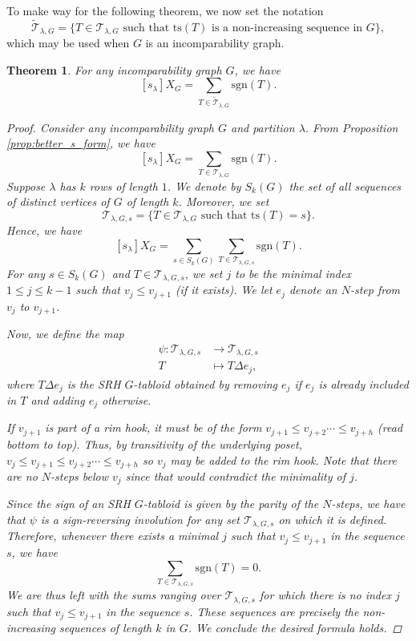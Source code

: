 \documentclass[12pt]{amsart}
\numberwithin{equation}{section}
\theoremstyle{plain}
\newtheorem{theorem}[equation]{Theorem}
\theoremstyle{definition}
\theoremstyle{remark}
\begin{document}
To make way for the following theorem, we now set the notation
\[
\tilde{\mathcal{T}}_{\lambda,G}=\{ T\in \mathcal{T}_{\lambda,G} \text{ such that } \text{ts}(T)\text{ is a non-increasing sequence in $G$}\},
\]
which may be used when $G$ is an incomparability graph.
\begin{theorem}
\label{thm:inv_paths_tail}
For any incomparability graph $G$, we have
\[
[s_{\lambda}]X_G=\sum_{T\in\tilde{\mathcal{T}}_{\lambda,G}}\mathrm{sgn}(T).
\]
\begin{proof}
Consider any incomparability graph $G$ and partition $\lambda$. From Proposition \ref{prop:better_s_form}, we have
\[
[s_{\lambda}]X_G=\sum_{T\in\mathcal{T}_{\lambda,G}}\mathrm{sgn}(T).
\]
Suppose $\lambda$ has $k$ rows of length $1$. We denote by $S_k(G)$ the set of all sequences of distinct vertices of $G$ of length $k$. Moreover, we set
\[
\mathcal{T}_{\lambda,G,s}=\{T\in\mathcal{T}_{\lambda,G}\text{ such that }\text{ts}(T)=s\}.
\]
Hence, we have
\[
[s_{\lambda}]X_G=\sum_{s\in S_k(G)}\sum_{T\in\mathcal{T}_{\lambda,G,s}}\mathrm{sgn}(T).
\]
For any $s\in S_k(G)$ and $T\in \mathcal{T}_{\lambda,G,s}$, we set $j$ to be the minimal index $1\le j \le k-1$ such that $v_j\le v_{j+1}$ (if it exists). We let $e_j$ denote an $N$-step from $v_j$ to $v_{j+1}$.

Now, we define the map
\begin{align*}
\psi: \mathcal{T}_{\lambda,G,s} &\to \mathcal{T}_{\lambda,G,s}\\
T &\mapsto T\Delta e_j,
\end{align*}
where $T\Delta e_j$ is the SRH $G$-tabloid obtained by removing $e_j$ if $e_j$ is already included in $T$ and adding $e_j$ otherwise.


If $v_{j+1}$ is part of a rim hook, it must be of the form $v_{j+1}\le v_{j+2}\cdots\le v_{j+h}$ (read bottom to top). Thus, by transitivity of the underlying poset, $v_{j}\le v_{j+1}\le v_{j+2}\cdots\le v_{j+h}$ so $v_j$ may be added to the rim hook. Note that there are no $N$-steps below $v_j$ since that would contradict the minimality of $j$. 


Since the sign of an SRH $G$-tabloid is given by the parity of the $N$-steps, we have that $\psi$ is a sign-reversing involution for any set $\mathcal{T}_{\lambda,G,s}$ on which it is defined. Therefore, whenever there exists a minimal $j$ such that $v_j\le v_{j+1}$ in the sequence $s$, we have
\[
\sum_{T\in\mathcal{T}_{\lambda,G,s}}\mathrm{sgn}(T)=0.
\]
We are thus left with the sums ranging over $\mathcal{T}_{\lambda,G,s}$ for which there is no index $j$ such that $v_j\le v_{j+1}$ in the sequence $s$. These sequences are precisely the non-increasing sequences of length $k$ in $G$. We conclude the desired formula holds. 
\end{proof}
\end{theorem}
\end{document}
